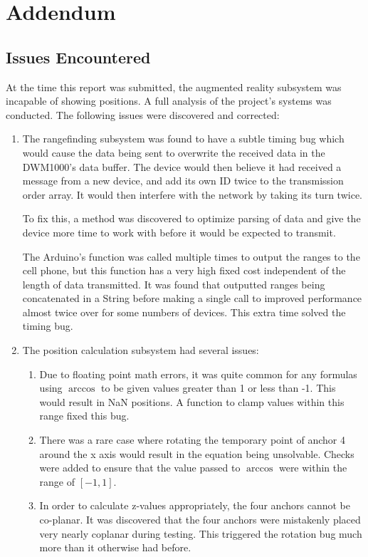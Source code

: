 \chapter{Addendum}
\label{Addendum}

\section{Issues Encountered}
At the time this report was submitted, the augmented reality subsystem was incapable of showing positions. A full analysis of the project's systems was conducted. The following issues were discovered and corrected:

\begin{enumerate}
	\item The rangefinding subsystem was found to have a subtle timing bug which would cause the data being sent to overwrite the received data in the DWM1000's data buffer. The device would then believe it had received a message from a new device, and add its own ID twice to the transmission order array. It would then interfere with the network by taking its turn twice.
	
	To fix this, a method was discovered to optimize parsing of data and give the device more time to work with before it would be expected to transmit. 
	
	The Arduino's  function was called multiple times to output the ranges to the cell phone, but this function has a very high fixed cost independent of the length of data transmitted. It was found that outputted ranges being concatenated in a String before making a single call to  improved performance almost twice over for some numbers of devices. This extra time solved the timing bug. 
	\item The position calculation subsystem had several issues:
	\begin{enumerate}
		\item Due to floating point math errors, it was quite common for any formulas using $\arccos$ to be given values greater than 1 or less than -1. This would result in NaN positions. A function to clamp values within this range fixed this bug.
		\item There was a rare case where rotating the temporary point of anchor 4 around the x axis would result in the equation being unsolvable. Checks were added to ensure that the value passed to $\arccos$ were within the range of $[-1, 1]$.
		\item In order to calculate z-values appropriately, the four anchors cannot be co-planar. It was discovered that the four anchors were mistakenly placed very nearly coplanar during testing. This triggered the rotation bug much more than it otherwise had before.
	\end{enumerate}
\end{enumerate}

